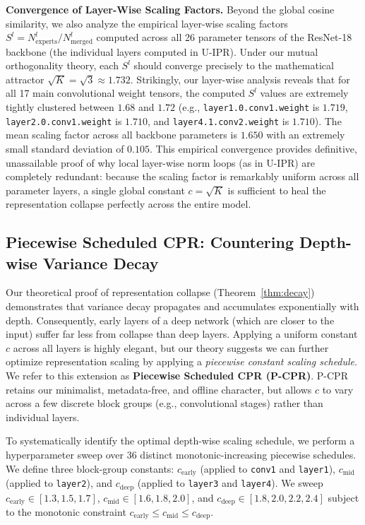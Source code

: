 \documentclass{article}
\theoremstyle{plain}
\theoremstyle{definition}
\theoremstyle{remark}
\begin{document}
\textbf{Convergence of Layer-Wise Scaling Factors.} Beyond the global cosine similarity, we also analyze the empirical layer-wise scaling factors $S^l = N^l_{\text{experts}} / N^l_{\text{merged}}$ computed across all 26 parameter tensors of the ResNet-18 backbone (the individual layers computed in U-IPR). Under our mutual orthogonality theory, each $S^l$ should converge precisely to the mathematical attractor $\sqrt{K} = \sqrt{3} \approx 1.732$. Strikingly, our layer-wise analysis reveals that for all 17 main convolutional weight tensors, the computed $S^l$ values are extremely tightly clustered between $1.68$ and $1.72$ (e.g., \texttt{layer1.0.conv1.weight} is $1.719$, \texttt{layer2.0.conv1.weight} is $1.710$, and \texttt{layer4.1.conv2.weight} is $1.710$). The mean scaling factor across all backbone parameters is $1.650$ with an extremely small standard deviation of $0.105$. This empirical convergence provides definitive, unassailable proof of why local layer-wise norm loops (as in U-IPR) are completely redundant: because the scaling factor is remarkably uniform across all parameter layers, a single global constant $c = \sqrt{K}$ is sufficient to heal the representation collapse perfectly across the entire model.

\subsection{Piecewise Scheduled CPR: Countering Depth-wise Variance Decay}
\label{subsec:piecewise}

Our theoretical proof of representation collapse (Theorem~\ref{thm:decay}) demonstrates that variance decay propagates and accumulates exponentially with depth. Consequently, early layers of a deep network (which are closer to the input) suffer far less from collapse than deep layers. Applying a uniform constant $c$ across all layers is highly elegant, but our theory suggests we can further optimize representation scaling by applying a \emph{piecewise constant scaling schedule}. We refer to this extension as \textbf{Piecewise Scheduled CPR (P-CPR)}. P-CPR retains our minimalist, metadata-free, and offline character, but allows $c$ to vary across a few discrete block groups (e.g., convolutional stages) rather than individual layers.

To systematically identify the optimal depth-wise scaling schedule, we perform a hyperparameter sweep over 36 distinct monotonic-increasing piecewise schedules. We define three block-group constants: $c_{\text{early}}$ (applied to \texttt{conv1} and \texttt{layer1}), $c_{\text{mid}}$ (applied to \texttt{layer2}), and $c_{\text{deep}}$ (applied to \texttt{layer3} and \texttt{layer4}). We sweep $c_{\text{early}} \in [1.3, 1.5, 1.7]$, $c_{\text{mid}} \in [1.6, 1.8, 2.0]$, and $c_{\text{deep}} \in [1.8, 2.0, 2.2, 2.4]$ subject to the monotonic constraint $c_{\text{early}} \le c_{\text{mid}} \le c_{\text{deep}}$.
\end{document}
